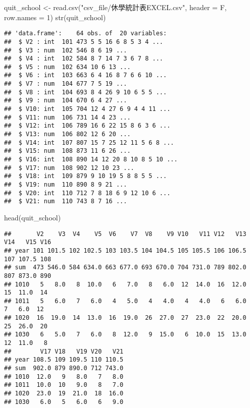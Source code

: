 \documentclass[
]{article}
\newenvironment{Shaded}{\begin{snugshade}}{\end{snugshade}}
\newcommand{\AttributeTok}[1]{\textcolor[rgb]{0.77,0.63,0.00}{#1}}
\newcommand{\DecValTok}[1]{\textcolor[rgb]{0.00,0.00,0.81}{#1}}
\newcommand{\FunctionTok}[1]{\textcolor[rgb]{0.00,0.00,0.00}{#1}}
\newcommand{\NormalTok}[1]{#1}
\newcommand{\OtherTok}[1]{\textcolor[rgb]{0.56,0.35,0.01}{#1}}
\newcommand{\StringTok}[1]{\textcolor[rgb]{0.31,0.60,0.02}{#1}}
\begin{document}
\begin{Shaded}
\begin{Highlighting}[]
\NormalTok{quit\_school }\OtherTok{\textless{}{-}} \FunctionTok{read.csv}\NormalTok{(}\StringTok{"csv\_file/休學統計表EXCEL.csv"}\NormalTok{, }\AttributeTok{header =}\NormalTok{ F, }\AttributeTok{row.names =} \DecValTok{1}\NormalTok{)}
\FunctionTok{str}\NormalTok{(quit\_school)}
\end{Highlighting}
\end{Shaded}

\begin{verbatim}
## 'data.frame':    64 obs. of  20 variables:
##  $ V2 : int  101 473 5 5 16 6 8 5 3 4 ...
##  $ V3 : num  102 546 8 6 19 ...
##  $ V4 : int  102 584 8 7 14 7 3 6 7 8 ...
##  $ V5 : num  102 634 10 6 13 ...
##  $ V6 : int  103 663 6 4 16 8 7 6 6 10 ...
##  $ V7 : num  104 677 7 5 19 ...
##  $ V8 : int  104 693 8 4 26 9 10 6 5 5 ...
##  $ V9 : num  104 670 6 4 27 ...
##  $ V10: int  105 704 12 4 27 6 9 4 4 11 ...
##  $ V11: num  106 731 14 4 23 ...
##  $ V12: int  106 789 16 6 22 15 8 6 3 6 ...
##  $ V13: num  106 802 12 6 20 ...
##  $ V14: int  107 807 15 7 25 12 11 5 6 8 ...
##  $ V15: num  108 873 11 6 26 ...
##  $ V16: int  108 890 14 12 20 8 10 8 5 10 ...
##  $ V17: num  108 902 12 10 23 ...
##  $ V18: int  109 879 9 10 19 5 8 8 5 5 ...
##  $ V19: num  110 890 8 9 21 ...
##  $ V20: int  110 712 7 8 18 6 9 12 10 6 ...
##  $ V21: num  110 743 8 7 16 ...
\end{verbatim}

\begin{Shaded}
\begin{Highlighting}[]
\FunctionTok{head}\NormalTok{(quit\_school)}
\end{Highlighting}
\end{Shaded}

\begin{verbatim}
##       V2    V3  V4    V5  V6    V7  V8    V9 V10   V11 V12   V13 V14   V15 V16
## year 101 101.5 102 102.5 103 103.5 104 104.5 105 105.5 106 106.5 107 107.5 108
## sum  473 546.0 584 634.0 663 677.0 693 670.0 704 731.0 789 802.0 807 873.0 890
## 1010   5   8.0   8  10.0   6   7.0   8   6.0  12  14.0  16  12.0  15  11.0  14
## 1011   5   6.0   7   6.0   4   5.0   4   4.0   4   4.0   6   6.0   7   6.0  12
## 1020  16  19.0  14  13.0  16  19.0  26  27.0  27  23.0  22  20.0  25  26.0  20
## 1030   6   5.0   7   6.0   8  12.0   9  15.0   6  10.0  15  13.0  12  11.0   8
##        V17 V18   V19 V20   V21
## year 108.5 109 109.5 110 110.5
## sum  902.0 879 890.0 712 743.0
## 1010  12.0   9   8.0   7   8.0
## 1011  10.0  10   9.0   8   7.0
## 1020  23.0  19  21.0  18  16.0
## 1030   6.0   5   6.0   6   9.0
\end{verbatim}
\end{document}
